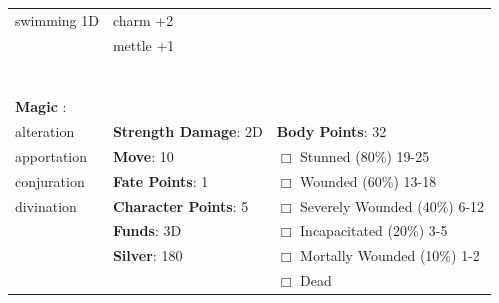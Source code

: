 \documentclass[10pt]{article}
\begin{document}
\begin{table}
\begin{tabular}{m{156pt} m{156pt} m{156pt}}
swimming          1D \hrulefill & charm             +2 \hrulefill &  \hrulefill \\

 \hrulefill & mettle            +1 \hrulefill &  \hrulefill \\

 \hrulefill &  \hrulefill &  \hrulefill \\

 \hrulefill &  \hrulefill &  \hrulefill \\

 \hrulefill &  \hrulefill &  \hrulefill \\

 \hrulefill &  \hrulefill &  \hrulefill \\

 \hrulefill &  \hrulefill &  \hrulefill \\

 \hrulefill &  \hrulefill &  \hrulefill \\

                                  &                                 &                             \\
\textbf{Magic }:  \hrulefill  &                                 &                             \\
alteration           \hrulefill & \textbf{Strength Damage}: 2D \hrulefill                             & \textbf{Body Points}: 32 \hrulefill \\
apportation          \hrulefill                        & \textbf{Move}:             10             \hrulefill    & $\Box$ Stunned \footnotesize{(80\%)} \hfill 19-25 \\
conjuration          \hrulefill                        & \textbf{Fate Points}:      1      \hrulefill    & $\Box$ Wounded \footnotesize{(60\%)} \hfill 13-18 \\
divination           \hrulefill                        & \textbf{Character Points}: 5 \hrulefill    & $\Box$ Severely Wounded \footnotesize{(40\%)} \hfill 6-12 \\
 \hrulefill                        & \textbf{Funds}:            3D            \hrulefill    & $\Box$ Incapacitated \footnotesize{(20\%)} \hfill 3-5 \\
 \hrulefill                        & \textbf{Silver}:           180           \hrulefill    & $\Box$ Mortally Wounded \footnotesize{(10\%)} \hfill 1-2 \\
 \hrulefill                        &  \hrulefill                                                       & $\Box$ Dead   \\
\end{tabular}
\end{table}
\cleardoublepage
\end{document}
